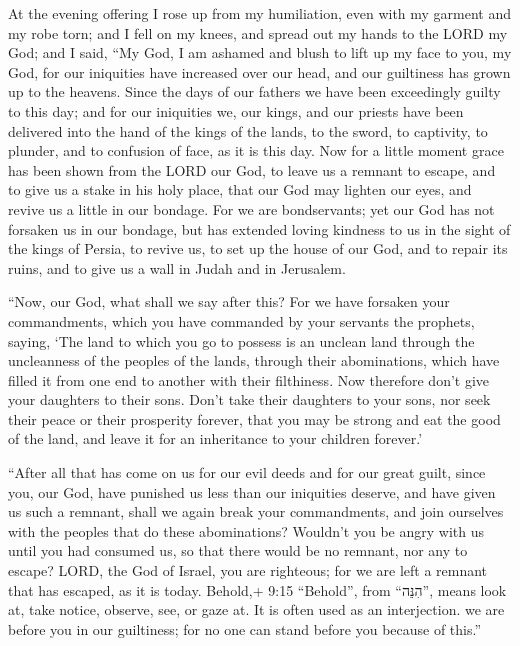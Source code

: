  At the evening offering I rose up from my humiliation, even
with my garment and my robe torn; and I fell on my knees, and spread out
my hands to the LORD my God;  and I said, ``My God, I am
ashamed and blush to lift up my face to you, my God, for our iniquities
have increased over our head, and our guiltiness has grown up to the
heavens.  Since the days of our fathers we have been
exceedingly guilty to this day; and for our iniquities we, our kings,
and our priests have been delivered into the hand of the kings of the
lands, to the sword, to captivity, to plunder, and to confusion of face,
as it is this day.  Now for a little moment grace has been
shown from the LORD our God, to leave us a remnant to escape, and to
give us a stake in his holy place, that our God may lighten our eyes,
and revive us a little in our bondage.  For we are
bondservants; yet our God has not forsaken us in our bondage, but has
extended loving kindness to us in the sight of the kings of Persia, to
revive us, to set up the house of our God, and to repair its ruins, and
to give us a wall in Judah and in Jerusalem.

 ``Now, our God, what shall we say after this? For we have
forsaken your commandments,  which you have commanded by
your servants the prophets, saying, `The land to which you go to possess
is an unclean land through the uncleanness of the peoples of the lands,
through their abominations, which have filled it from one end to another
with their filthiness.  Now therefore don't give your
daughters to their sons. Don't take their daughters to your sons, nor
seek their peace or their prosperity forever, that you may be strong and
eat the good of the land, and leave it for an inheritance to your
children forever.'

 ``After all that has come on us for our evil deeds and for
our great guilt, since you, our God, have punished us less than our
iniquities deserve, and have given us such a remnant, 
shall we again break your commandments, and join ourselves with the
peoples that do these abominations? Wouldn't you be angry with us until
you had consumed us, so that there would be no remnant, nor any to
escape?  LORD, the God of Israel, you are righteous; for we
are left a remnant that has escaped, as it is today. Behold,+ 9:15
``Behold'', from ``הִנֵּה'', means look at, take notice, observe, see,
or gaze at. It is often used as an interjection. we are before you in
our guiltiness; for no one can stand before you because of this.''

